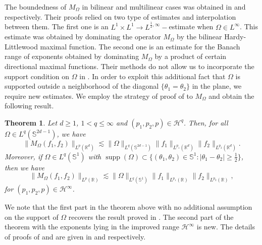 \documentclass[a4paper,reqno]{amsart}
\newcommand{\R}{{\mathbb R}}       %
\newcommand{\Sp}{{\mathbb S}}
\newcommand{\supp}[1]{\operatorname{supp}(#1)}   %
\newtheorem{theorem}{Theorem}[section]
\theoremstyle{definition}
\numberwithin{equation}{section}
\begin{document}
The boundedness of $M_\Omega$ in bilinear and multilinear cases was obtained in \cite{BH2019} and \cite{GHHP2024ae} respectively. Their proofs relied on two type of estimates and interpolation between them. The first one is an $L^1\times L^1\to L^{\frac{1}{2},\infty}-$estimate when $\Omega\in L^\infty$. This estimate was obtained by dominating the operator $M_\Omega$ by the bilinear Hardy-Littlewood maximal function. The second one is an estimate for the Banach range of exponents obtained by dominating $M_\Omega$ by a product of certain directional maximal functions. Their methods do not allow us to incorporate the support condition on $\Omega$ in . In order to exploit this additional fact that $\Omega$ is supported outside a neighborhood of the diagonal $\{\theta_1=\theta_2\}$ in the plane, we require new estimates. We employ the strategy of proof of  to $M_\Omega$ and obtain the following result.
\begin{theorem}\label{Thm:Roughsinglemaximal}
	Let $d\geq1$, $1<q\leq\infty$ and $(p_1,p_2,p)\in\mathcal{H}^q$. Then, for all $\Omega\in L^q(\Sp^{2d-1})$, we have
	\[\|M_\Omega(f_1,f_2)\|_{L^p(\R^d)}\lesssim\|\Omega\|_{L^q(\Sp^{2d-1})}\|f_1\|_{L^{p_1}(\R^d)}\|f_2\|_{L^{p_2}(\R^d)}.\]
	Moreover, if $\Omega\in L^q(\Sp^{1})$ with $\supp{\Omega}\subset \{(\theta_1,\theta_2)\in\Sp^1:|\theta_1-\theta_2|\geq\frac{1}{2}\}$, then we have
	\[\|M_\Omega(f_1,f_2)\|_{L^p(\R)}\lesssim\|\Omega\|_{L^q(\Sp^{1})}\|f_1\|_{L^{p_1}(\R)}\|f_2\|_{L^{p_2}(\R)},\]
	for $(p_1,p_2,p)\in\mathcal{H}^\infty$.
\end{theorem}
We note that the first part in the theorem above with no additional assumption on the support of $\Omega$ recovers the result proved in \cite{BH2019}. The second part of the theorem with the exponents lying in the improved range $\mathcal{H}^\infty$ is new. The details of proofs of  and  are given in  and  respectively.
\end{document}
